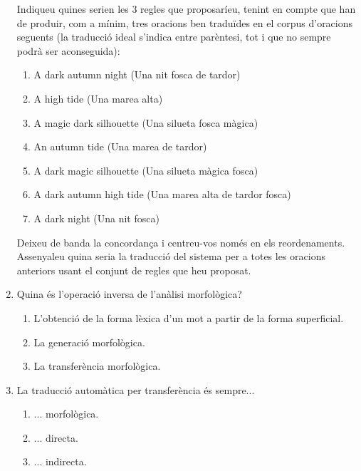 \begin{enumerate}
      Indiqueu quines serien les 3 regles que proposaríeu, tenint en
      compte que han de produir, com a mínim, tres oracions ben
      traduïdes en el corpus d'oracions seguents (la traducció ideal
      s'indica entre parèntesi, tot i que no sempre podrà ser
      aconseguida):

    \begin{enumerate}
    \item \textsf{A dark autumn night} (\textsf{Una nit fosca de tardor})

    \item \textsf{A high tide} (\textsf{Una marea alta})
      
    \item \textsf{A magic dark silhouette} (\textsf{Una silueta fosca
        màgica})

    \item \textsf{An autumn tide} (\textsf{Una marea de tardor})

    \item \textsf{A dark magic silhouette} (\textsf{Una silueta màgica fosca})

    \item \textsf{A dark autumn high tide} (\textsf{Una marea alta de
    tardor fosca})
 
\item \textsf{A dark night} (\textsf{Una nit fosca})
    \end{enumerate}
    
    Deixeu de banda la concordança i centreu-vos només en els
    reordenaments. Assenyaleu quina seria la traducció del sistema
    per a totes les oracions anteriors usant el conjunt de regles que
    heu proposat.


\item Quina és l'operació inversa de l'anàlisi morfològica?
\begin{enumerate}
\item L'obtenció de la forma lèxica d'un mot a partir de la forma
superficial.
\item La generació morfològica.
\item La transferència morfològica.
\end{enumerate}

\item La traducció automàtica per transferència és sempre...
\begin{enumerate}
\item ... morfològica.
\item ... directa.
\item ... indirecta.
\end{enumerate}


\end{enumerate}
